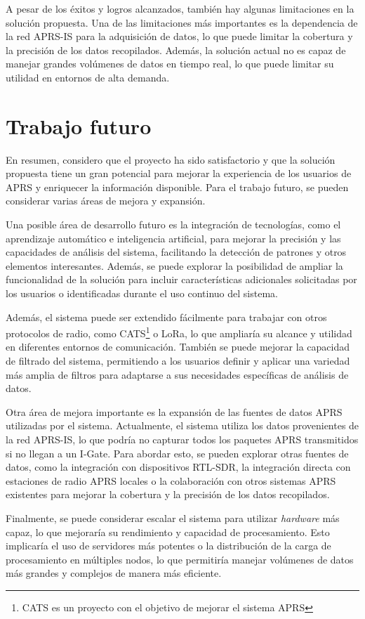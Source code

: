 A pesar de los éxitos y logros alcanzados, también hay algunas limitaciones en la solución propuesta. Una de las limitaciones más importantes es la dependencia de la red APRS-IS para la adquisición de datos, lo que puede limitar la cobertura y la precisión de los datos recopilados. Además, la solución actual no es capaz de manejar grandes volúmenes de datos en tiempo real, lo que puede limitar su utilidad en entornos de alta demanda. 

\section{Trabajo futuro}

En resumen, considero que el proyecto ha sido satisfactorio y que la solución propuesta tiene un gran potencial para mejorar la experiencia de los usuarios de APRS y enriquecer la información disponible. Para el trabajo futuro, se pueden considerar varias áreas de mejora y expansión.

Una posible área de desarrollo futuro es la integración de tecnologías, como el aprendizaje automático e inteligencia artificial, para mejorar la precisión y las capacidades de análisis del sistema, facilitando la detección de patrones y otros elementos interesantes. Además, se puede explorar la posibilidad de ampliar la funcionalidad de la solución para incluir características adicionales solicitadas por los usuarios o identificadas durante el uso continuo del sistema.

Además, el sistema puede ser extendido fácilmente para trabajar con otros protocolos de radio, como CATS\footnote{CATS es un proyecto con el objetivo de mejorar el sistema APRS} o LoRa, lo que ampliaría su alcance y utilidad en diferentes entornos de comunicación. También se puede mejorar la capacidad de filtrado del sistema, permitiendo a los usuarios definir y aplicar una variedad más amplia de filtros para adaptarse a sus necesidades específicas de análisis de datos.

Otra área de mejora importante es la expansión de las fuentes de datos APRS utilizadas por el sistema. Actualmente, el sistema utiliza los datos provenientes de la red APRS-IS, lo que podría no capturar todos los paquetes APRS transmitidos si no llegan a un I-Gate. Para abordar esto, se pueden explorar otras fuentes de datos, como la integración con dispositivos RTL-SDR, la integración directa con estaciones de radio APRS locales o la colaboración con otros sistemas APRS existentes para mejorar la cobertura y la precisión de los datos recopilados.

Finalmente, se puede considerar escalar el sistema para utilizar \textit{hardware} más capaz, lo que mejoraría su rendimiento y capacidad de procesamiento. Esto implicaría el uso de servidores más potentes o la distribución de la carga de procesamiento en múltiples nodos, lo que permitiría manejar volúmenes de datos más grandes y complejos de manera más eficiente.



